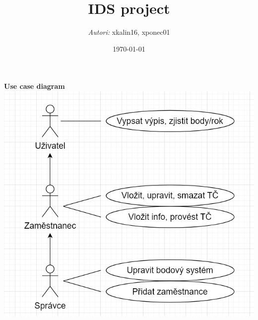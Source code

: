 \documentclass[a4paper,12pt]{article}
\title{IDS project}
\author{\textit{Autori:} xkalin16, xponec01}
\date{\today}
\begin{document}
    \maketitle
    \newpage

    \begin{center}
        {\Large \textbf{Use case diagram}}
        \includegraphics[scale=0.7]{imgs/class_diagram.png} \\
    \end{center}
\end{document}
